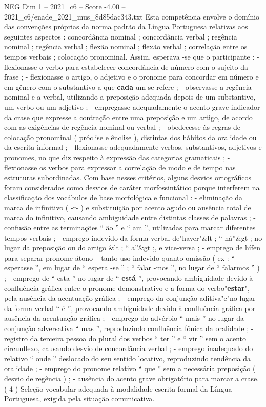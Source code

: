 \begin{textsample}{NEG Dim 1 – 2021\_c6 – Score -4.00 – 2021\_c6/enade\_2021\_mus\_8d85dac343.txt}
Esta competência envolve o domínio das convenções próprias da norma padrão da Língua Portuguesa relativas aos seguintes aspectos : concordância nominal ; concordância verbal ; regência nominal ; regência verbal ; flexão nominal ; flexão verbal ; correlação entre os tempos verbais ; colocação pronominal.
Assim, esperava -se que o participante : - flexionasse o verbo para estabelecer concordância de número com o sujeito da frase ; - flexionasse o artigo, o adjetivo e o pronome para concordar em número e em gênero com o substantivo a que \textbf{cada} um se refere ; - observasse a regência nominal e a verbal, utilizando a preposição adequada depois de um substantivo, um verbo ou um adjetivo ; - empregasse adequadamente o acento grave indicador da crase que expresse a contração entre uma preposição e um artigo, de acordo com as exigências de regência nominal ou verbal ; - obedecesse às regras de colocação pronominal ( próclise e ênclise ), distintas dos hábitos da oralidade ou da escrita informal ; - flexionasse adequadamente verbos, substantivos, adjetivos e pronomes, no que diz respeito à expressão das categorias gramaticais ; - flexionasse os verbos para expressar a correlação de modo e de tempo nas estruturas subordinadas.
Com base nesses critérios, alguns desvios ortográficos foram considerados como desvios de caráter morfossintático porque interferem na classificação dos vocábulos de base morfológica e funcional : - eliminação da marca de infinitivo ( -r- ) e substituição por acento agudo ou ausência total de marca do infinitivo, causando ambiguidade entre distintas classes de palavras ; - confusão entre as terminações “ ão ” e “ am ”, utilizadas para marcar diferentes tempos verbais ; - emprego indevido da forma verbal de"haver"\&lt ; “ há”\&gt ; no lugar da preposição ou do artigo \&lt ; “ a”\&gt ;, e vice-versa ; - emprego de hífen para separar pronome átono – tanto uso indevido quanto omissão ( ex : “ esperasse ”, em lugar de “ espera -se ” ; “ falar -mos ”, no lugar de “ falarmos ” ) ; - emprego de “ esta ” no lugar de “ \textbf{está} ”, provocando ambiguidade devido à confluência gráfica entre o pronome demonstrativo e a forma do verbo"\textbf{estar}", pela ausência da acentuação gráfica ; - emprego da conjunção aditiva"e"no lugar da forma verbal “ é ”, provocando ambiguidade devido à confluência gráfica por ausência da acentuação gráfica ; - emprego do advérbio “ mais ” no lugar da conjunção adversativa “ mas ”, reproduzindo confluência fônica da oralidade ; - registro da terceira pessoa do plural dos verbos “ ter ” e “ vir ” sem o acento circunflexo, causando desvio de concordância verbal ; - emprego inadequado do relativo “ onde ” deslocado do seu sentido locativo, reproduzindo tendência da oralidade ; - emprego do pronome relativo “ que ” sem a necessária preposição ( desvio de regência ) ; - ausência do acento grave obrigatório para marcar a crase. ( 4 ) Seleção vocabular adequada à modalidade escrita formal da Língua Portuguesa, exigida pela situação comunicativa.

\end{textsample}
